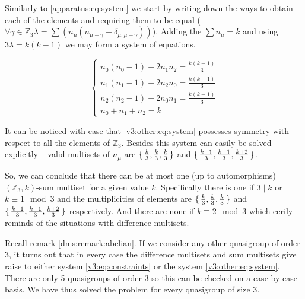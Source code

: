     Similarly to \eqref{apparatus:eq:system} we start by writing down the ways to obtain each of the elements and requiring them to be equal ($\forall \gamma \in \mathbb Z_3 \lambda = \sum (n_\mu (n_{\mu-\gamma}-\delta_{\mu,\mu+\gamma}))$). Adding the $\sum n_\mu = k$ and using $3\lambda = k(k-1)$ we may form a system of equations.
    
    \begin{equation}
        \label{v3:other:eq:system}
        \begin{cases}
            n_0 (n_0-1) + 2 n_1 n_2 = \frac{k(k-1)}{3} \\
            n_1 (n_1-1) + 2 n_2 n_0 = \frac{k(k-1)}{3} \\
            n_2 (n_2-1) + 2 n_0 n_1 = \frac{k(k-1)}{3} \\
            n_0 + n_1 + n_2 = k
        \end{cases}
    \end{equation}

    It can be noticed with ease that \eqref{v3:other:eq:system} possesses symmetry with respect to all the elements of $\mathbb Z_3$. Besides this system can easily be solved explicitly -- valid multisets of $n_\mu$ are $\set{\frac k 3, \frac k 3, \frac k 3}$ and $\set{\frac{k-1}{3}, \frac{k-1}{3}, \frac{k+2}{3}}$.
    
    So, we can conclude that there can be at most one (up to automorphisms) $(\mathbb Z_3, k)$-sum multiset for a given value $k$. Specifically there is one if $3 \mid k$ or $k \equiv 1 \mod 3$ and the multiplicities of elements are $\set{\frac k 3, \frac k 3, \frac k 3}$ and $\set{\frac{k-1}{3}, \frac{k-1}{3}, \frac{k+2}{3}}$ respectively. And there are none if $k \equiv 2 \mod 3$ which eerily reminds of the situations with difference multisets.
    
    Recall remark \ref{dms:remark:abelian}. If we consider any other quasigroup of order 3, it turns out that in every case the difference multisets and sum multisets give raise to either system \eqref{v3:eq:constraints} or the system \eqref{v3:other:eq:system}. There are only 5 quasigroups of order 3 so this can be checked on a case by case basis. We have thus solved the problem for every quasigroup of size 3.
    
